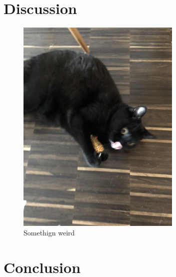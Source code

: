 \documentclass{scrartcl}
\begin{document}
\section{Discussion}\label{sec:discussion}

\begin{figure}
    \centering
    \includegraphics[width=0.7\textwidth]{weird.jpg}
    \caption{Somethign weird}
    \label{fig:weird}
\end{figure}

\lipsum[1]

\section{Conclusion}\label{sec:conclusion}

\lipsum[2]



\end{document}
